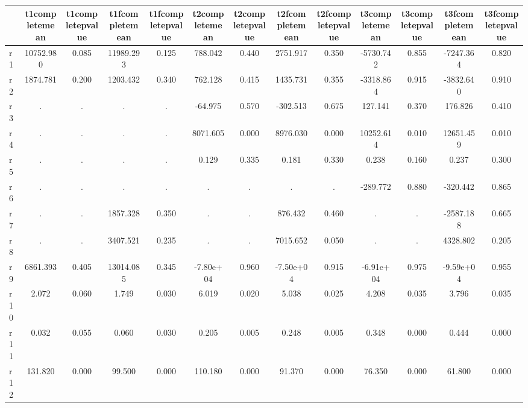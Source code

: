 \begin{table}[htbp]
\begin{tabular}{lcccccccccccc} \hline \hline
 & t1completemean  & t1completepvalue  & t1fcompletemean  & t1fcompletepvalue  & t2completemean  & t2completepvalue  & t2fcompletemean  & t2fcompletepvalue  & t3completemean  & t3completepvalue  & t3fcompletemean  & t3fcompletepvalue  \\  \hline 
r1 & 10752.980 &     0.085 & 11989.293 &     0.125 &   788.042 &     0.440 &  2751.917 &     0.350 & -5730.742 &     0.855 & -7247.364 &     0.820 \\  
r2 &  1874.781 &     0.200 &  1203.432 &     0.340 &   762.128 &     0.415 &  1435.731 &     0.355 & -3318.864 &     0.915 & -3832.640 &     0.910 \\  
r3 &         . &         . &         . &         . &   -64.975 &     0.570 &  -302.513 &     0.675 &   127.141 &     0.370 &   176.826 &     0.410 \\  
r4 &         . &         . &         . &         . &  8071.605 &     0.000 &  8976.030 &     0.000 & 10252.614 &     0.010 & 12651.459 &     0.010 \\  
r5 &         . &         . &         . &         . &     0.129 &     0.335 &     0.181 &     0.330 &     0.238 &     0.160 &     0.237 &     0.300 \\  
r6 &         . &         . &         . &         . &         . &         . &         . &         . &  -289.772 &     0.880 &  -320.442 &     0.865 \\  
r7 &         . &         . &  1857.328 &     0.350 &         . &         . &   876.432 &     0.460 &         . &         . & -2587.188 &     0.665 \\  
r8 &         . &         . &  3407.521 &     0.235 &         . &         . &  7015.652 &     0.050 &         . &         . &  4328.802 &     0.205 \\  
r9 &  6861.393 &     0.405 & 13014.085 &     0.345 & -7.80e+04 &     0.960 & -7.50e+04 &     0.915 & -6.91e+04 &     0.975 & -9.59e+04 &     0.955 \\  
r10 &     2.072 &     0.060 &     1.749 &     0.030 &     6.019 &     0.020 &     5.038 &     0.025 &     4.208 &     0.035 &     3.796 &     0.035 \\  
r11 &     0.032 &     0.055 &     0.060 &     0.030 &     0.205 &     0.005 &     0.248 &     0.005 &     0.348 &     0.000 &     0.444 &     0.000 \\  
r12 &   131.820 &     0.000 &    99.500 &     0.000 &   110.180 &     0.000 &    91.370 &     0.000 &    76.350 &     0.000 &    61.800 &     0.000 \\  
\hline \hline \end{tabular}
\end{table}
